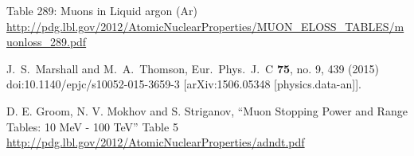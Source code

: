 \begin{thebibliography}{1}

   Table 289: Muons in Liquid argon (Ar) \url{http://pdg.lbl.gov/2012/AtomicNuclearProperties/MUON_ELOSS_TABLES/muonloss_289.pdf}

  J.~S.~Marshall and M.~A.~Thomson,
  Eur.\ Phys.\ J.\ C {\bf 75}, no. 9, 439 (2015)
  doi:10.1140/epjc/s10052-015-3659-3
  [arXiv:1506.05348 [physics.data-an]].

  D. E. Groom, N. V. Mokhov and S. Striganov, ``Muon Stopping Power and Range Tables: 10 MeV - 100 TeV'' Table 5
  \url{http://pdg.lbl.gov/2012/AtomicNuclearProperties/adndt.pdf}
  

  
  






\end{thebibliography}
